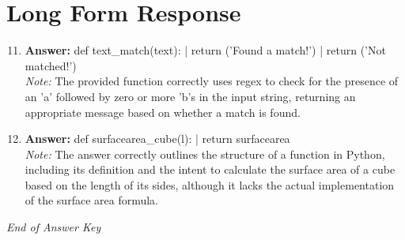 \documentclass[12pt]{article}
\begin{document}
\section*{Long Form Response}
\begin{enumerate}[label=\arabic*.]
\setcounter{enumi}{10}
\item \textbf{Answer:} def text\_match(text): | return ('Found a match!') | return ('Not matched!')
\\ \textit{Note:} The provided function correctly uses regex to check for the presence of an 'a' followed by zero or more 'b's in the input string, returning an appropriate message based on whether a match is found.
\item \textbf{Answer:} def surfacearea\_cube(l): | return surfacearea
\\ \textit{Note:} The answer correctly outlines the structure of a function in Python, including its definition and the intent to calculate the surface area of a cube based on the length of its sides, although it lacks the actual implementation of the surface area formula.
\end{enumerate}

\vfill
\noindent\textit{End of Answer Key}
\end{document}
